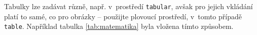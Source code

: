 \documentclass[thesis=B,slovak]{FITthesis}[2013/05/06]
\begin{document}
% 
% 
% 
% 
% 
% 
% 
% 
% 
% 
% 
% 
 Tabulky lze zadávat různě, např. v~prostředí \verb|tabular|, avšak pro jejich vkládání platí to samé, co pro obrázky -- použijte plovoucí prostředí, v~tomto případě \verb|table|. Například tabulka \ref{tab:matematika} byla vložena tímto způsobem.
 
\end{document}
